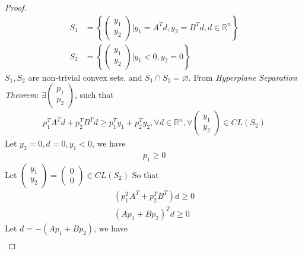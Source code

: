 \documentclass[runningheads]{llncs}
\begin{document}
\begin{proof}
\begin{align}
        S_1 &= 
        \left\{
            \left(
            \begin{array}{ll}
                y_1 \\
                y_2
            \end{array}
            \right)
            | y_1 = A^Td, y_2 = B^Td, d \in \mathbb{R}^n
        \right\} \\
        S_2 &= 
        \left\{
            \left(
            \begin{array}{ll}
                y_1 \\
                y_2
            \end{array}
            \right)
            | y_1 < 0, y_2 = 0
        \right\} 
    \end{align}
    $S_1, S_2$ are non-trivial convex sets,
    and $S_1 \cap S_2 = \varnothing$.
    From \textit{Hyperplane Separation Theorem}:
    $\exists 
    \left(
    \begin{array}{ll}
        p_1 \\
        p_2
    \end{array}
    \right)$, such that
    \begin{align}
        p_1^TA^Td + p_2^TB^Td \geq p_1^Ty_1 + p_2^Ty_2,
        \forall d \in \mathbb{R}^n, 
        \forall\left(
        \begin{array}{ll}
            y_1 \\
            y_2
        \end{array}
        \right) \in CL(S_2)
    \end{align}
    Let $y_2 = 0, d = 0, y_1 < 0$, we have
    \begin{align}
        p_1 \geq 0
    \end{align}
    Let $\left(
        \begin{array}{ll}
            y_1 \\
            y_2
        \end{array}
        \right) = 
        \left(
        \begin{array}{ll}
            0 \\
            0
        \end{array}
        \right) 
         \in CL(S_2)$
    So that
    \begin{align}
        (p_1^TA^T + p_2^TB^T)d \geq 0 \\
        (Ap_1 + Bp_2)^Td \geq 0
    \end{align}
    Let $d = - (Ap_1 + Bp_2)$, we have
    \begin{align}

\end{align}
\end{proof}
\end{document}
